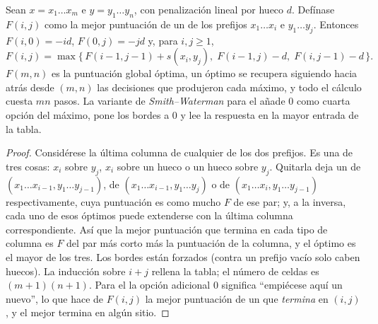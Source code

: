 \begin{theorem}\label{thm:b3:bioinformatics:nw}
Sean $x = x_{1}\dots x_{m}$ e $y = y_{1}\dots y_{n}$, con penalización
lineal por hueco $d$. Defínase $F(i,j)$ como la mejor puntuación de un
 de los prefijos $x_{1}\dots x_{i}$ e
$y_{1}\dots y_{j}$. Entonces $F(i,0) = -id$, $F(0,j) = -jd$ y, para
$i,j \ge 1$,
\[
F(i,j) = \max\bigl\{\,F(i-1,j-1) + s(x_{i},y_{j}),\;
F(i-1,j) - d,\; F(i,j-1) - d\,\bigr\}.
\]
$F(m,n)$ es la puntuación global óptima, un  óptimo se
recupera siguiendo hacia atrás desde $(m,n)$ las decisiones que
produjeron cada máximo, y todo el cálculo cuesta $mn$ pasos. La variante
de \emph{Smith--Waterman} para el  añade $0$ como
cuarta opción del máximo, pone los bordes a $0$ y lee la respuesta en la
mayor entrada de la tabla.
\end{theorem}
\begin{proof}
Considérese la última columna de cualquier  de los dos
prefijos. Es una de tres cosas: $x_{i}$ sobre $y_{j}$, $x_{i}$ sobre un
hueco o un hueco sobre $y_{j}$. Quitarla deja un  de
$(x_{1}\dots x_{i-1},
y_{1}\dots y_{j-1})$, de $(x_{1}\dots x_{i-1}, y_{1}\dots y_{j})$ o de
$(x_{1}\dots x_{i}, y_{1}\dots y_{j-1})$ respectivamente, cuya puntuación
es como mucho $F$ de ese par; y, a la inversa, cada uno de esos
 óptimos puede extenderse con la última columna
correspondiente. Así que la mejor puntuación que termina en cada tipo de
columna es $F$ del par más corto más la puntuación de la columna, y el
óptimo es el mayor de los tres. Los bordes están forzados (contra un
prefijo vacío solo caben huecos). La inducción sobre $i + j$ rellena la
tabla; el número de celdas es $(m+1)(n+1)$. Para el  la
opción adicional $0$ significa ``empiécese aquí un  nuevo'',
lo que hace de $F(i,j)$ la mejor puntuación de un  que
\emph{termina} en $(i,j)$, y el mejor  termina en algún
sitio.
\end{proof}

